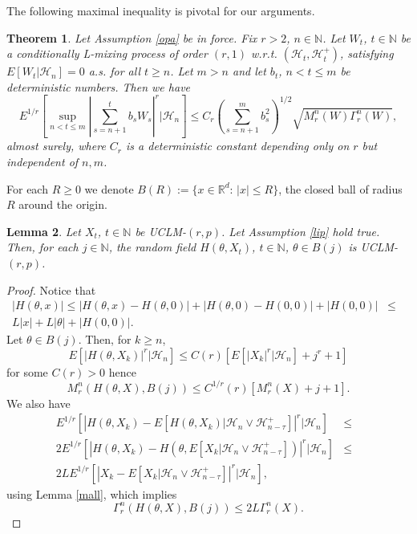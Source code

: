\documentclass[a4paper,draft]{article}
\newtheorem{theorem}{Theorem}[section]
\newtheorem{lemma}[theorem]{Lemma}
\begin{document}
The following maximal inequality is pivotal for our arguments.

\begin{theorem}\label{estim} Let Assumption \ref{opa} be in force.
Fix $r>2$, $n\in \mathbb{N}$.
Let $W_t$, $t\in\mathbb{N}$ be a conditionally L-mixing process of order
$(r,1)$ w.r.t. $(\mathcal{H}_t,\mathcal{H}_t^+)$, satisfying
$E[W_t\vert\mathcal{H}_n]=0$ a.s. for all {$t\geq n$}.
Let $m >n$ and let $b_t$, $n< t\leq m$ be deterministic numbers. Then we have
\begin{equation}\label{mandrill}
E^{1/r}\left[ \sup_{n < t \le m} \left| \sum_{s = n+1}^{t} b_s W_s \right|^r \big\vert\mathcal{H}_n \right]
 \le C_r \left( \sum_{s=n+1}^{m} b_s^2 \right)^{1/2} \sqrt{{M}_r^{n}(W) \Gamma_r^{n}(W)},
\end{equation}
almost surely, where $C_r$ is a deterministic constant depending only on $r$ but independent of $n,m$.
\end{theorem}

For each $R\geq 0$
we denote $B(R):=\{x\in\mathbb{R}^d:\, |x|\leq R\}$, the closed
ball of radius $R$ around the origin.

\begin{lemma}\label{below} Let $X_t$, $t\in\mathbb{N}$ be UCLM-$(r,p)$. Let Assumption \ref{lip} hold true. Then,
for each $j\in\mathbb{N}$, the random field $H(\theta,X_t)$,
$t\in\mathbb{N}$, $\theta\in B(j)$ is UCLM-$(r,p)$.
\end{lemma}
\begin{proof} Notice that
\begin{eqnarray*}
|H(\theta,x)|\leq |H(\theta,x)-H(\theta,0)|+
|H(\theta,0)-H(0,0)|+ |H(0,0)| &\leq&\\
L|x| + L|\theta|+|H(0,0)|.
\end{eqnarray*}
Let $\theta\in B(j)$. Then, for $k\geq n$,
$$
E[|H(\theta,X_k)|^r\vert\mathcal{H}_n]\leq
C(r)[E[|X_k|^r\vert\mathcal{H}_n]+j^r+1]
$$
for some $C(r)>0$ hence
$$
M^n_r(H(\theta,X),B(j))\leq C^{1/r}(r)[M_r^n(X)+j+1].
$$
We also have
\begin{eqnarray*}
E^{1/r}[|H(\theta,X_k)-E[H(\theta,X_k)\vert\mathcal{H}_n\vee\mathcal{H}_{n-\tau}^+]|^r\vert\mathcal{H}_n] &\leq&\\
2E^{1/r}[|H(\theta,X_k)-H(\theta,E[X_k\vert\mathcal{H}_n\vee\mathcal{H}_{n-\tau}^+])|^r\vert\mathcal{H}_n] &\leq&\\
2L E^{1/r}[|X_k-E[X_k\vert\mathcal{H}_n\vee\mathcal{H}_{n-\tau}^+]|^r
\vert\mathcal{H}_n], & &
\end{eqnarray*}
using Lemma \ref{mall}, which implies
$$
\Gamma^n_r(H(\theta,X),B(j))\leq 2L\Gamma^n_r(X).
$$
\end{proof}
\end{document}
